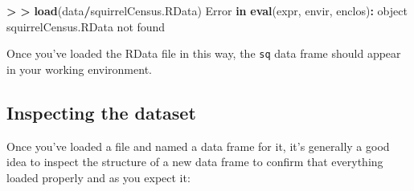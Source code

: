 \documentclass[
]{book}
\newenvironment{Shaded}{\begin{snugshade}}{\end{snugshade}}
\newcommand{\ControlFlowTok}[1]{\textcolor[rgb]{0.13,0.29,0.53}{\textbf{#1}}}
\newcommand{\ErrorTok}[1]{\textcolor[rgb]{0.64,0.00,0.00}{\textbf{#1}}}
\newcommand{\FunctionTok}[1]{\textcolor[rgb]{0.13,0.29,0.53}{\textbf{#1}}}
\newcommand{\NormalTok}[1]{#1}
\newcommand{\SpecialCharTok}[1]{\textcolor[rgb]{0.81,0.36,0.00}{\textbf{#1}}}
\newcommand{\StringTok}[1]{\textcolor[rgb]{0.31,0.60,0.02}{#1}}
\begin{document}
\begin{Shaded}
\begin{Highlighting}[]
\SpecialCharTok{\textgreater{}} 
\ErrorTok{\textgreater{}} \FunctionTok{load}\NormalTok{(data}\SpecialCharTok{/}\NormalTok{squirrelCensus.RData)}
\NormalTok{Error }\ControlFlowTok{in} \FunctionTok{eval}\NormalTok{(expr, envir, enclos)}\SpecialCharTok{:}\NormalTok{ object }\StringTok{\textquotesingle{}squirrelCensus.RData\textquotesingle{}}\NormalTok{ not found}
\end{Highlighting}
\end{Shaded}

Once you've loaded the RData file in this way, the \texttt{sq} data frame should appear in your working environment.

\subsection{Inspecting the dataset}\label{inspecting-the-dataset}

Once you've loaded a file and named a data frame for it, it's generally a good idea to inspect the structure of a new data frame to confirm that everything loaded properly and as you expect it:
\end{document}
